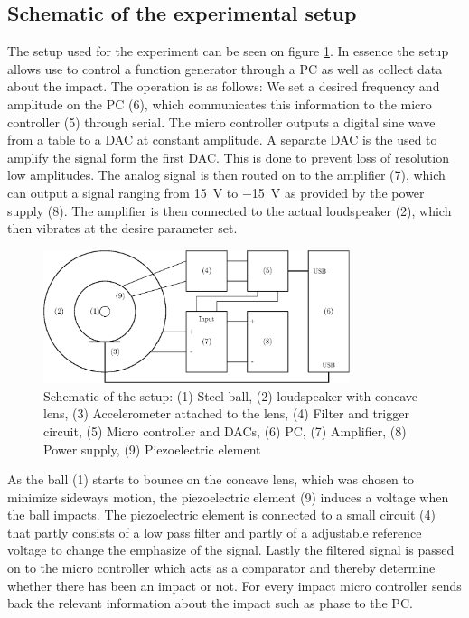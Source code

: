 \documentclass[12pt,oneside,a4paper]{article}
\numberwithin{equation}{section}
\begin{document}
{{{{\subsection{Schematic of the experimental setup}
The setup used for the experiment can be seen on figure \ref{setupdia}. In essence the setup allows use to control a function generator through a PC as well as collect data about the impact. The operation is as follows: We set a desired frequency and amplitude on the PC (6), which communicates this information to the micro controller (5) through serial. The micro controller outputs a digital sine wave from a table to a DAC at constant amplitude. A separate DAC is the used to amplify the signal form the first DAC. This is done to prevent loss of resolution low amplitudes. The analog signal is then routed on to the amplifier (7), which can output a signal ranging from \SI{+15}{V} to \SI{-15}{V} as provided by the power supply (8). The amplifier is then connected to the actual loudspeaker (2), which then vibrates at the desire parameter set.
\begin{figure}[h]
	\centering
	\includegraphics[width=0.8\textwidth]{setup}
	\caption{Schematic of the setup: (1) Steel ball, (2) loudspeaker with concave lens, (3) Accelerometer attached to the lens, (4) Filter and trigger circuit, (5) Micro controller and DACs, (6) PC, (7) Amplifier, (8) Power supply, (9) Piezoelectric element}
	\label{setupdia}
\end{figure}
As the ball (1) starts to bounce on the concave lens, which was chosen to minimize sideways motion, the piezoelectric element (9) induces a voltage when the ball impacts. The piezoelectric element is connected to a small circuit (4) that partly consists of a low pass filter and partly of a adjustable reference voltage to change the emphasize of the signal. Lastly the filtered signal is passed on to the micro controller which acts as a comparator and thereby determine whether there has been an impact or not. For every impact micro controller sends back the relevant information about the impact such as phase to the PC.

}}}}
\end{document}
